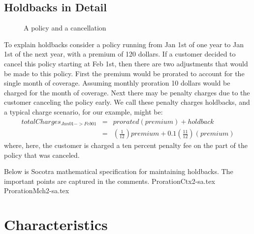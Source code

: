 \subsection{Holdbacks in Detail}

\begin{figure}[ht]
  \caption{
    A policy and a cancellation
  }
  \label{fig:3:2}
\end{figure}

To explain holdbacks consider a policy running from Jan 1st of one year to Jan 1st of the next year, with a
premium of 120 dollars. If
a customer decided to cancel this policy starting at Feb 1st, then there are two adjustments that would
be made to this policy. First the premium would be prorated to account for the single month of coverage.
Assuming monthly proration 10 dollars would be charged for the month of coverage. Next there may be penalty
charges due to the customer canceling the policy early. We call these penalty charges holdbacks, and a typical
charge scenario, for our example, might be:
\begin{eqnarray*}
totalCharges_{Jan01->Feb01} & = & prorated(premium) + holdback \\
                          & = & (\frac{1}{12}) premium + 0.1(\frac{11}{12})(premium)
\end{eqnarray*}
where, here, the customer is charged a ten percent penalty fee on the part of the policy that was canceled.


Below is Socotra mathematical specification for maintaining holdbacks. The important points are captured in
the comments.
{ProrationCtx2-sa.tex}
{ProrationMch2-sa.tex}


\section{Characteristics}
\label{sec:03:4}

